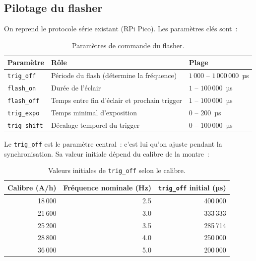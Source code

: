 \documentclass[a4paper,11pt]{article}
\newcommand{\code}[1]{\colorbox{codebg}{\texttt{#1}}}
\begin{document}
\subsection{Pilotage du flasher}

On reprend le protocole série existant (RPi Pico). Les paramètres clés sont~:

\begin{table}[h]
    \centering
    \begin{tabular}{l l l}
        \toprule
        \textbf{Paramètre} & \textbf{Rôle} & \textbf{Plage} \\
        \midrule
        \code{trig\_off}   & Période du flash (détermine la fréquence) & $1\,000$ -- $1\,000\,000$~µs \\
        \code{flash\_on}   & Durée de l'éclair               & $1$ -- $100\,000$~µs \\
        \code{flash\_off}  & Temps entre fin d'éclair et prochain trigger & $1$ -- $100\,000$~µs \\
        \code{trig\_expo}  & Temps minimal d'exposition       & $0$ -- $200$~µs \\
        \code{trig\_shift} & Décalage temporel du trigger     & $0$ -- $100\,000$~µs \\
        \bottomrule
    \end{tabular}
    \caption{Paramètres de commande du flasher.}
    \label{tab:flasher-params}
\end{table}

Le \code{trig\_off} est le paramètre central~: c'est lui qu'on ajuste pendant la synchronisation. Sa valeur initiale dépend du calibre de la montre~:

\begin{table}[h]
    \centering
    \begin{tabular}{r r r}
        \toprule
        \textbf{Calibre (A/h)} & \textbf{Fréquence nominale (Hz)} & \textbf{\code{trig\_off} initial (µs)} \\
        \midrule
        18\,000 & 2.5 & 400\,000 \\
        21\,600 & 3.0 & 333\,333 \\
        25\,200 & 3.5 & 285\,714 \\
        28\,800 & 4.0 & 250\,000 \\
        36\,000 & 5.0 & 200\,000 \\
        \bottomrule
    \end{tabular}
    \caption{Valeurs initiales de \code{trig\_off} selon le calibre.}
    \label{tab:calibres}
\end{table}
\end{document}
